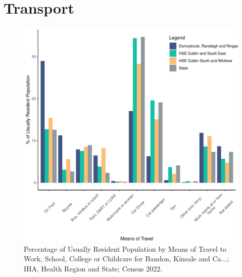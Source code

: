 \documentclass{article}
\begin{document}
\section{Transport}\label{sect:Trans}
\begin{figure}[H]
	\centering
	\includegraphics[width = 120mm]{../figures/TravelED.pdf}
	\caption{Percentage of Usually Resident Population by Means of Travel to Work, School, College or Childcare for Bandon, Kinsale and Ca...; IHA, Health Region and State; Census 2022.}
	\label{fig:vbnv}
	\end{figure}
\end{document}
